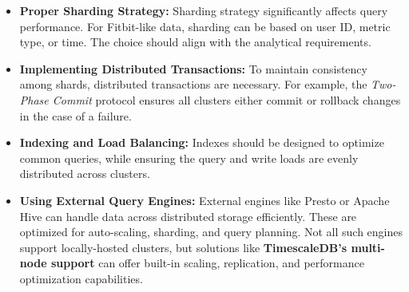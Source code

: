 \documentclass[a4paper, 12pt]{article}
\begin{document}
\begin{itemize}
    \item \textbf{Proper Sharding Strategy:} Sharding strategy significantly affects query performance. For Fitbit-like data, sharding can be based on user ID, metric type, or time. The choice should align with the analytical requirements.

    \item \textbf{Implementing Distributed Transactions:} To maintain consistency among shards, distributed transactions are necessary. For example, the \textit{Two-Phase Commit} protocol ensures all clusters either commit or rollback changes in the case of a failure.

    \item \textbf{Indexing and Load Balancing:} Indexes should be designed to optimize common queries, while ensuring the query and write loads are evenly distributed across clusters.

    \item \textbf{Using External Query Engines:} External engines like Presto or Apache Hive can handle data across distributed storage efficiently. These are optimized for auto-scaling, sharding, and query planning. Not all such engines support locally-hosted clusters, but solutions like \textbf{TimescaleDB's multi-node support} can offer built-in scaling, replication, and performance optimization capabilities.
\end{itemize}
\end{document}
